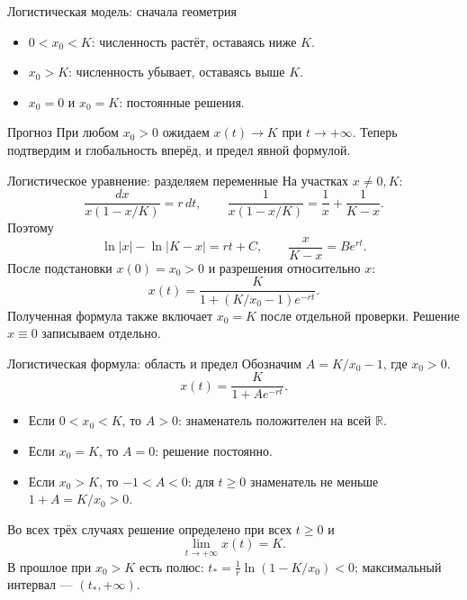 \documentclass[aspectratio=169,11pt]{beamer}
\newcommand{\R}{\mathbb R}
\begin{document}
\begin{frame}{Логистическая модель: сначала геометрия}
\begin{center}
\end{center}
\begin{itemize}
\item $0<x_0<K$: численность растёт, оставаясь ниже $K$.
\item $x_0>K$: численность убывает, оставаясь выше $K$.
\item $x_0=0$ и $x_0=K$: постоянные решения.
\end{itemize}
\begin{block}{Прогноз}
При любом $x_0>0$ ожидаем $x(t)\to K$ при $t\to+\infty$.
Теперь подтвердим и глобальность вперёд, и предел явной формулой.
\end{block}
\end{frame}

\begin{frame}{Логистическое уравнение: разделяем переменные}
На участках $x\ne0,K$:
\[
\frac{dx}{x(1-x/K)}=r\,dt,\qquad
\frac{1}{x(1-x/K)}=\frac1x+\frac1{K-x}.
\]
Поэтому
\[
\ln|x|-\ln|K-x|=rt+C,\qquad
\frac{x}{K-x}=Be^{rt}.
\]
После подстановки $x(0)=x_0>0$ и разрешения относительно $x$:
\[
\boxed{x(t)=\frac{K}{1+\left(K/x_0-1\right)e^{-rt}}}.
\]
Полученная формула также включает $x_0=K$ после отдельной проверки.
Решение $x\equiv0$ записываем отдельно.
\end{frame}

\begin{frame}{Логистическая формула: область и предел}
Обозначим $A=K/x_0-1$, где $x_0>0$.
\[
x(t)=\frac{K}{1+Ae^{-rt}}.
\]
\begin{itemize}
\item Если $0<x_0<K$, то $A>0$: знаменатель положителен на всей $\R$.
\item Если $x_0=K$, то $A=0$: решение постоянно.
\item Если $x_0>K$, то $-1<A<0$: для $t\ge0$ знаменатель
не меньше $1+A=K/x_0>0$.
\end{itemize}
Во всех трёх случаях решение определено при всех $t\ge0$ и
\[
\lim_{t\to+\infty}x(t)=K.
\]
\alert{В прошлое} при $x_0>K$ есть полюс:
$t_*=\frac1r\ln(1-K/x_0)<0$; максимальный интервал --- $(t_*,+\infty)$.
\end{frame}
\end{document}
